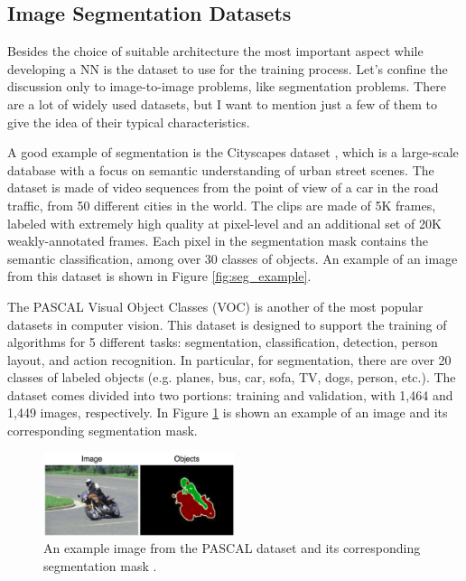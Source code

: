 \subsection{Image Segmentation Datasets}
Besides the choice of suitable architecture the most important aspect while developing a NN is the dataset to use for the training process. Let's confine the discussion only to image-to-image problems, like segmentation problems. There are a lot of widely used datasets, but I want to mention just a few of them to give the idea of their typical characteristics.

A good example of segmentation is the Cityscapes dataset \cite{Cityscapes}, which is a large-scale database with a focus on semantic understanding of urban street scenes. The dataset is made of video sequences from the point of view of a car in the road traffic, from 50 different cities in the world. The clips are made of 5K frames, labeled with extremely high quality at pixel-level and an additional set of 20K weakly-annotated frames. Each pixel in the segmentation mask contains the semantic classification, among over 30 classes of objects. An example of an image from this dataset is shown in Figure \ref{fig:seg_example}.

The PASCAL Visual Object Classes (VOC) \cite{PASCAL} is another of the most popular datasets in computer vision. This dataset is designed to support the training of algorithms for 5 different tasks: segmentation, classification, detection, person layout, and action recognition. In particular, for segmentation, there are over 20 classes of labeled objects (e.g. planes, bus, car, sofa, TV, dogs, person, etc.). The dataset comes divided into two portions: training and validation, with 1,464 and 1,449 images, respectively. In Figure \ref{fig:PASCAL} is shown an example of an image and its corresponding segmentation mask.

    \begin{figure}
        \centering
        \includegraphics[width = 0.5\textwidth]{images/PASCAL}
        \caption{An example image from the PASCAL dataset and its corresponding segmentation mask \cite{PASCAL}.}
        \label{fig:PASCAL}
    \end{figure}

